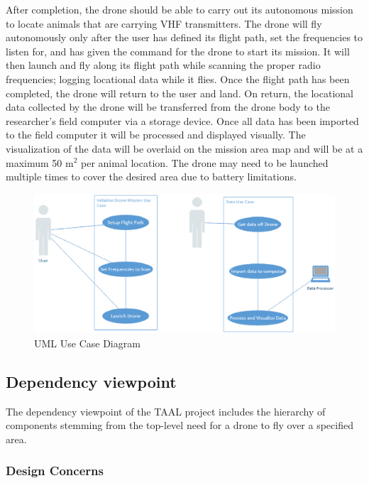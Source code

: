 \documentclass[onecolumn, draftclsnofoot,10pt, compsoc]{IEEEtran}
\begin{document}
After completion, the drone should be able to carry out its autonomous mission to locate animals that are carrying VHF transmitters.
The drone will fly autonomously only after the user has defined its flight path, set the frequencies to listen for, and has given the command for the drone to start its mission.
It will then launch and fly along its flight path while scanning the proper radio frequencies; logging locational data while it flies.
Once the flight path has been completed, the drone will return to the user and land.
On return, the locational data collected by the drone will be transferred from the drone body to the researcher's field computer via a storage device.
Once all data has been imported to the field computer it will be processed and displayed visually.
The visualization of the data will be overlaid on the mission area map and will be at a maximum 50 m${^{2}}$ per animal location.
The drone may need to be launched multiple times to cover the desired area due to battery limitations.

\begin{figure}[h]

\includegraphics[width=7in]{useCase.eps}
\captionsetup{justification=centering}
\caption{UML Use Case Diagram}
\centering
\end{figure}

\subsection{Dependency viewpoint}

The dependency viewpoint of the TAAL project includes the hierarchy of components stemming from the top-level need for a drone to fly over a specified area.

\subsubsection{Design Concerns}
\end{document}
